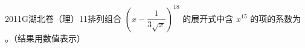 
\begin{problem}{2011}{G}{湖北卷（理）}{11}{排列组合}
$\left(x-\dfrac{1}{3\sqrt{x}}\right)^{18}$ 的展开式中含 $x^{15}$ 的项的系数为 \underline{\hspace{4em}}。（结果用数值表示）
\end{problem}

\begin{answer}

\end{answer}

\begin{solutions}

\end{solutions}